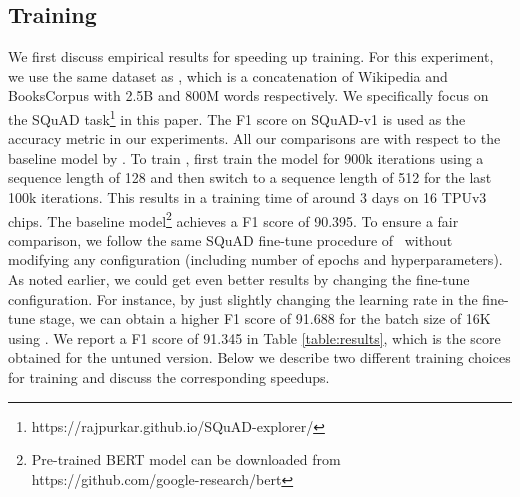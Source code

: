 \documentclass{article} \usepackage{iclr2020_conference,times}
\begin{document}
\subsection{ Training}
We first discuss empirical results for speeding up  training. For this experiment, we use the same dataset as \cite{devlin2018bert}, which is a concatenation of Wikipedia and BooksCorpus with 2.5B and 800M words respectively. We specifically focus on the SQuAD task\footnote{https://rajpurkar.github.io/SQuAD-explorer/} in this paper. 
The F1 score on SQuAD-v1 is used as the accuracy metric in our experiments. All our comparisons are with respect to the baseline  model by \cite{devlin2018bert}. To train , \citet{devlin2018bert} first train the model for 900k iterations using a sequence length of 128 and then switch to a sequence length of 512 for the last 100k iterations. This results in a training time of around 3 days on 16 TPUv3 chips. The baseline  model\footnote{Pre-trained BERT model can be downloaded  from https://github.com/google-research/bert} achieves a F1 score of 90.395. To ensure a fair comparison, we follow the same SQuAD fine-tune procedure of~\cite{devlin2018bert} without modifying any configuration (including number of epochs and hyperparameters). As noted earlier, we could get even better results by changing the fine-tune configuration. For instance, by just slightly changing the learning rate in the fine-tune stage, we can obtain a higher F1 score of 91.688 for the batch size of 16K using . We report a F1 score of 91.345 in Table \ref{table:results}, which is the score obtained for the untuned version. Below we describe two different training choices for training  and discuss the corresponding speedups.
\end{document}
